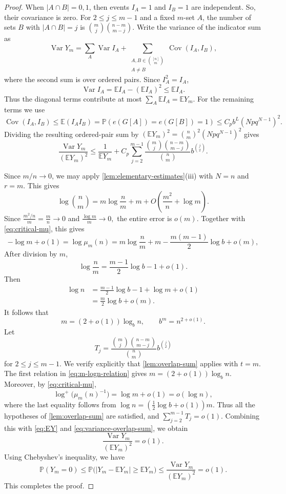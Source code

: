 \documentclass[11pt,reqno]{amsart}
\theoremstyle{definition}
\theoremstyle{remark}
\newcommand{\EE}{\mathbb E}
\newcommand{\PP}{\mathbb P}
\begin{document}
\begin{proof}
When $|A\cap B|=0,1$, then events $I_A=1$ and $I_B=1$ are independent.  So, their covariance is zero.  For $2\le j\le m-1$ and a fixed $m$-set $A$, the number of
sets $B$ with $|A\cap B|=j$ is
$\binom mj\binom{n-m}{m-j}$.  Write the variance of the indicator sum as
\[
 \operatorname{Var}Y_m
 =\sum_A\operatorname{Var}I_A
  +\sum_{\substack{A,B\in\binom{[n]}m\\A\ne B}}
    \operatorname{Cov}(I_A,I_B),
\]
where the second sum is over ordered pairs.  Since $I_A^2=I_A$,
\[
 \operatorname{Var}I_A
 =\EE I_A-(\EE I_A)^2\le\EE I_A.
\]
Thus the diagonal terms contribute at most
$\sum_A\EE I_A=\EE Y_m$.  For the remaining terms we use
$$\operatorname{Cov}(I_A,I_B)\le\EE(I_AI_B)=\PP(e(G[A])=e(G[B])=1)
 \leq C_p b^{L}(Np q^{N-1})^2.$$
   Dividing the resulting ordered-pair sum by
$(\EE Y_m)^2=\binom nm^2(Np q^{N-1})^2$ gives
\begin{equation}\label{eq:variance-overlap-sum}
 \frac{\operatorname{Var}Y_m}{(\EE Y_m)^2}
 \le\frac1{\EE Y_m}
 +C_p\sum_{j=2}^{m-1}
 \frac{\binom mj\binom{n-m}{m-j}}{\binom nm}
 b^{\binom j2}.
\end{equation}

\smallskip


Since $m/n\to0$, we may apply
\cref{lem:elementary-estimates}(iii) with $N=n$ and $r=m$.  This gives
\[
 \log\binom nm
 =m\log\frac nm+m
  +O\!\left(\frac{m^2}{n}+\log m\right).
\]
Since
$
 \frac{m^2/n}{m}=\frac mn\longrightarrow0
 $
 and $
 \frac{\log m}{m}\longrightarrow0,
$
the entire error is $o(m)$.  Together with
\eqref{eq:critical-mu}, this gives
\[
 -\log m+o(1)
 =\log\mu_m(n)
 =m\log\frac nm+m-\frac{m(m-1)}2\log b+o(m),
\]
After division by $m$,
\[
 \log\frac nm
 =\frac{m-1}{2}\log b-1+o(1).
\]
Then
\begin{align*}
 \log n
 &=\frac{m-1}{2}\log b-1+\log m+o(1)\\
 &=\frac m2\log b+o(m).
\end{align*}
  It follows that
\begin{equation}\label{eq:m-logn-relation}
 m=(2+o(1))\log_b n,\qquad b^m=n^{2+o(1)}.
\end{equation}
Let
\[
 T_j=\frac{\binom mj\binom{n-m}{m-j}}{\binom nm}
 b^{\binom j2}
\] for $2\leq j\leq m-1$.
We verify explicitly that \cref{lem:overlap-sum} applies with $t=m$.
The first relation in \eqref{eq:m-logn-relation} gives
$m=(2+o(1))\log_b n$.  Moreover, by \eqref{eq:critical-mu},
\[
 \log^+\!\bigl(\mu_m(n)^{-1}\bigr)
 =\log m+o(1)=o(\log n),
\]
where the last equality follows from $\log n=(\tfrac12\log b+o(1))m$.
Thus all the hypotheses of \cref{lem:overlap-sum} are satisfied, and
$\sum_{j=2}^{m-1}T_j=o(1)$. Combining this with \eqref{eq:EY} and
\eqref{eq:variance-overlap-sum}, we obtain
\[
 \frac{\operatorname{Var}Y_m}{(\EE Y_m)^2}=o(1).
\]
 Using Chebyshev's inequality, we have
\[
 \PP(Y_m=0)
 \le\PP\bigl(|Y_m-\EE Y_m|\ge\EE Y_m\bigr)
 \le\frac{\operatorname{Var}Y_m}{(\EE Y_m)^2}=o(1).
\]
This completes the proof.
\end{proof}
\end{document}
